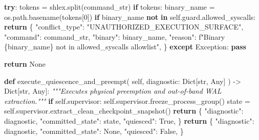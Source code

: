 \documentclass[
  10pt,letterpaper]{article}
\newenvironment{Shaded}{}{}
\newcommand{\BuiltInTok}[1]{\textcolor[rgb]{0.00,0.50,0.00}{#1}}
\newcommand{\CommentTok}[1]{\textcolor[rgb]{0.38,0.63,0.69}{\textit{#1}}}
\newcommand{\ControlFlowTok}[1]{\textcolor[rgb]{0.00,0.44,0.13}{\textbf{#1}}}
\newcommand{\DecValTok}[1]{\textcolor[rgb]{0.25,0.63,0.44}{#1}}
\newcommand{\KeywordTok}[1]{\textcolor[rgb]{0.00,0.44,0.13}{\textbf{#1}}}
\newcommand{\NormalTok}[1]{#1}
\newcommand{\OperatorTok}[1]{\textcolor[rgb]{0.40,0.40,0.40}{#1}}
\newcommand{\PreprocessorTok}[1]{\textcolor[rgb]{0.74,0.48,0.00}{#1}}
\newcommand{\SpecialCharTok}[1]{\textcolor[rgb]{0.25,0.44,0.63}{#1}}
\newcommand{\SpecialStringTok}[1]{\textcolor[rgb]{0.73,0.40,0.53}{#1}}
\newcommand{\StringTok}[1]{\textcolor[rgb]{0.25,0.44,0.63}{#1}}
\newcommand{\VariableTok}[1]{\textcolor[rgb]{0.10,0.09,0.49}{#1}}
\begin{document}
\begin{Shaded}
\begin{Highlighting}[]
            \ControlFlowTok{try}\NormalTok{:}
\NormalTok{                tokens }\OperatorTok{=}\NormalTok{ shlex.split(command\_str)}
                \ControlFlowTok{if}\NormalTok{ tokens:}
\NormalTok{                    binary\_name }\OperatorTok{=}\NormalTok{ os.path.basename(tokens[}\DecValTok{0}\NormalTok{])}
                    \ControlFlowTok{if}\NormalTok{ binary\_name }\KeywordTok{not} \KeywordTok{in} \VariableTok{self}\NormalTok{.guard.allowed\_syscalls:}
                        \ControlFlowTok{return}\NormalTok{ \{}
                            \StringTok{"conflict\_type"}\NormalTok{: }\StringTok{"UNAUTHORIZED\_EXECUTION\_SURFACE"}\NormalTok{,}
                            \StringTok{"command"}\NormalTok{: command\_str,}
                            \StringTok{"binary"}\NormalTok{: binary\_name,}
                            \StringTok{"reason"}\NormalTok{: }\SpecialStringTok{f"Binary \textquotesingle{}}\SpecialCharTok{\{}\NormalTok{binary\_name}\SpecialCharTok{\}}\SpecialStringTok{\textquotesingle{} not in allowed\_syscalls allowlist"}\NormalTok{,}
\NormalTok{                        \}}
            \ControlFlowTok{except} \PreprocessorTok{Exception}\NormalTok{:}
                \ControlFlowTok{pass}

        \ControlFlowTok{return} \VariableTok{None}

    \KeywordTok{def}\NormalTok{ execute\_quiescence\_and\_preempt(}
        \VariableTok{self}\NormalTok{, diagnostic: Dict[}\BuiltInTok{str}\NormalTok{, Any]}
\NormalTok{    ) }\OperatorTok{{-}\textgreater{}}\NormalTok{ Dict[}\BuiltInTok{str}\NormalTok{, Any]:}
        \CommentTok{"""Executes physical preemption and out{-}of{-}band WAL extraction."""}
        \ControlFlowTok{if} \VariableTok{self}\NormalTok{.supervisor:}
            \VariableTok{self}\NormalTok{.supervisor.freeze\_process\_group()}
\NormalTok{            state }\OperatorTok{=} \VariableTok{self}\NormalTok{.supervisor.extract\_clean\_checkpoint\_snapshot()}
            \ControlFlowTok{return}\NormalTok{ \{}
                \StringTok{"diagnostic"}\NormalTok{: diagnostic,}
                \StringTok{"committed\_state"}\NormalTok{: state,}
                \StringTok{"quiesced"}\NormalTok{: }\VariableTok{True}\NormalTok{,}
\NormalTok{            \}}
        \ControlFlowTok{return}\NormalTok{ \{}
            \StringTok{"diagnostic"}\NormalTok{: diagnostic,}
            \StringTok{"committed\_state"}\NormalTok{: }\VariableTok{None}\NormalTok{,}
            \StringTok{"quiesced"}\NormalTok{: }\VariableTok{False}\NormalTok{,}
\NormalTok{        \}}


\end{Highlighting}
\end{Shaded}
\end{document}
